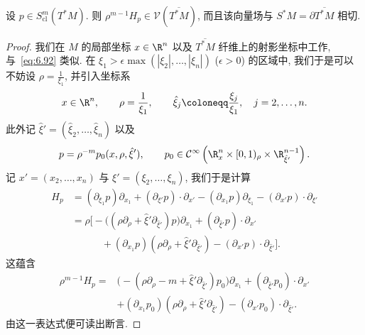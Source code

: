 \begin{lemma}\label{lem:8.24}
设 $p \in S_{\mathrm{cl}}^m(T^*M)$. 则 $\rho^{m-1}H_p \in \mathcal{V}(\overline{T^*M})$, 而且该向量场与 $S^*M = \partial\overline{T^*M}$ 相切.
\end{lemma}

\begin{proof}
我们在 $M$ 的局部坐标 $x \in \R^n$ 以及 $\overline{T^*M}$ 纤维上的射影坐标中工作, 与~\eqref{eq:6.92} 类似. 在 $\xi_1 > \epsilon\max(| \xi_2 |, \ldots, | \xi_n |)$ ($\epsilon > 0$) 的区域中, 我们于是可以不妨设 $\rho = \frac{1}{\xi_1}$, 并引入坐标系
\begin{equation}\label{eq:8.91}
    x \in \R^n, \qquad \rho = \frac{1}{\xi_1}, \qquad \hat{\xi}_j \defeq \frac{\xi_j}{\xi_1}, \quad j = 2, \ldots, n.
\end{equation}
此外记 $\hat{\xi}' = (\hat{\xi}_2, \ldots, \hat{\xi}_n)$ 以及
\begin{equation}\label{eq:8.92}
    p = \rho^{-m}p_0(x, \rho, \hat{\xi}'), \qquad p_0 \in \Smooth\left( \R_x^n \times [0, 1)_\rho \times \R_{\hat{\xi}'}^{n-1} \right).
\end{equation}
记 $x' = (x_2, \ldots, x_n)$ 与 $\xi' = (\xi_2, \ldots, \xi_n)$, 我们于是计算
\begin{equation}\label{eq:8.93}
    \begin{aligned}
        H_p
        &= (\partial_{\xi_1}p)\partial_{x_1} + (\partial_{\xi'}p) \cdot \partial_{x'} - (\partial_{x_1}p)\partial_{\xi_1} - (\partial_{x'}p) \cdot \partial_{\xi'} \\
        &= \rho\Big[ -\big( (\rho\partial_\rho + \hat{\xi}'\partial_{\hat{\xi}'})p \big)\partial_{x_1} + (\partial_{\hat{\xi}'}p) \cdot \partial_{x'} \\
        &\qquad\quad + (\partial_{x_1}p)(\rho\partial_\rho + \hat{\xi}'\partial_{\hat{\xi}'}) - (\partial_{x'}p) \cdot \partial_{\hat{\xi}'} \Big].
    \end{aligned}
\end{equation}
这蕴含
\begin{equation}\label{eq:8.94}
    \begin{aligned}
        \rho^{m-1}H_p
        ={}& \big( -(\rho\partial_\rho - m + \hat{\xi}'\partial_{\hat{\xi}'})p_0 \big)\partial_{x_1} + (\partial_{\hat{\xi}'}p_0) \cdot \partial_{x'} \\
        &+ (\partial_{x_1}p_0)(\rho\partial_\rho + \hat{\xi}'\partial_{\hat{\xi}'}) - (\partial_{x'}p_0) \cdot \partial_{\hat{\xi}'}.
    \end{aligned}
\end{equation}
由这一表达式便可读出断言.
\end{proof}

